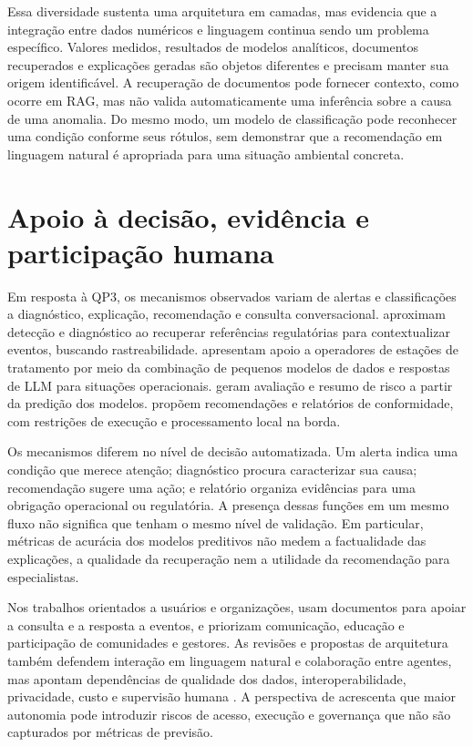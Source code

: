 Essa diversidade sustenta uma arquitetura em camadas, mas evidencia que a integração entre dados numéricos e linguagem continua sendo um problema específico. Valores medidos, resultados de modelos analíticos, documentos recuperados e explicações geradas são objetos diferentes e precisam manter sua origem identificável. A recuperação de documentos pode fornecer contexto, como ocorre em RAG, mas não valida automaticamente uma inferência sobre a causa de uma anomalia. Do mesmo modo, um modelo de classificação pode reconhecer uma condição conforme seus rótulos, sem demonstrar que a recomendação em linguagem natural é apropriada para uma situação ambiental concreta.

\section{Apoio à decisão, evidência e participação humana}
\label{sec:ea-apoio-decisao}

Em resposta à QP3, os mecanismos observados variam de alertas e classificações a diagnóstico, explicação, recomendação e consulta conversacional.  aproximam detecção e diagnóstico ao recuperar referências regulatórias para contextualizar eventos, buscando rastreabilidade.  apresentam apoio a operadores de estações de tratamento por meio da combinação de pequenos modelos de dados e respostas de LLM para situações operacionais.  geram avaliação e resumo de risco a partir da predição dos modelos.  propõem recomendações e relatórios de conformidade, com restrições de execução e processamento local na borda.

Os mecanismos diferem no nível de decisão automatizada. Um alerta indica uma condição que merece atenção; diagnóstico procura caracterizar sua causa; recomendação sugere uma ação; e relatório organiza evidências para uma obrigação operacional ou regulatória. A presença dessas funções em um mesmo fluxo não significa que tenham o mesmo nível de validação. Em particular, métricas de acurácia dos modelos preditivos não medem a factualidade das explicações, a qualidade da recuperação nem a utilidade da recomendação para especialistas.

Nos trabalhos orientados a usuários e organizações,  usam documentos para apoiar a consulta e a resposta a eventos, e  priorizam comunicação, educação e participação de comunidades e gestores. As revisões e propostas de arquitetura também defendem interação em linguagem natural e colaboração entre agentes, mas apontam dependências de qualidade dos dados, interoperabilidade, privacidade, custo e supervisão humana \cite{taiwo2025,arslan2026,liang2026,hosseini2026,rahman2026,liu2025,li2026,rashid2026}. A perspectiva de  acrescenta que maior autonomia pode introduzir riscos de acesso, execução e governança que não são capturados por métricas de previsão.

